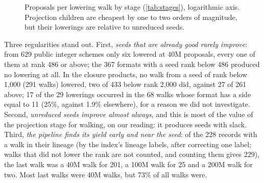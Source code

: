 \begin{figure}[t]
\centering
{}
\caption{Proposals per lowering walk by stage (\cref{tab:stages}), logarithmic axis. Projection children are cheapest by one to two orders of magnitude, but their lowerings are relative to unreduced seeds.}
\label{fig:yield}
\end{figure}

Three regularities stand out. First, \emph{seeds that are already good rarely improve}: from 629 public integer schemes only six lowered at 40M proposals, every one of them at rank 486 or above; the 367 formats with a seed rank below 486 produced no lowering at all.
In the closure products, no walk from a seed of rank below 1{,}000 (291 walks) lowered, two of 433 below rank 2{,}000 did, against 27 of 261 above; 17 of the 29 lowerings occurred in the 68 walks whose format has a side equal to 11 (25\%, against 1.9\% elsewhere), for a reason we did not investigate.
Second, \emph{unreduced seeds improve almost always}, and this is most of the value of the projection stage for walking, on our reading: it produces seeds with slack.
Third, \emph{the pipeline finds its yield early and near the seed}: of the 228 records with a walk in their lineage (by the index's lineage labels, after correcting one label; walks that did not lower the rank are not counted, and counting them gives 229), the last walk was a 40M walk for 201, a 100M walk for 25 and a 200M walk for two. Most last walks were 40M walks, but 73\% of all walks were.

